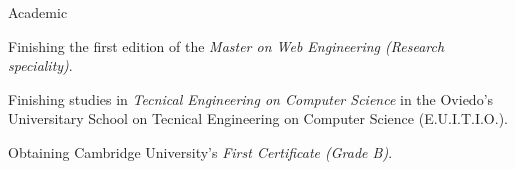 
\begin{rubric}{Academic}

  \entry*[2008]
  Finishing the first edition of the \emph{Master on Web Engineering (Research speciality)}.

  \entry*[2006]
  Finishing studies in \emph{Tecnical Engineering on Computer Science} in the Oviedo's Universitary School on Tecnical Engineering on Computer Science (E.U.I.T.I.O.).

  \entry*[2005]
  Obtaining Cambridge University's \emph{First Certificate (Grade B)}.

\end{rubric}


